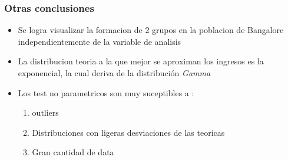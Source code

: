 \documentclass{beamer}
\begin{document}
\begin{frame}

  \frametitle{Otras conclusiones}

  \begin{itemize}
    \item Se logra visualizar la formacion de 2 grupos en la poblacion
      de Bangalore independientemente de la variable de analisis

    \item La distribucion teoria a la que mejor se aproximan los ingresos
      es la exponencial, la cual deriva de la distribución \textit{Gamma}

    \item Los test no parametricos son muy suceptibles a :
      \begin{enumerate}
        \item outliers
        \item Distribuciones con ligeras desviaciones de las teoricas
        \item Gran cantidad de data
      \end{enumerate}
  \end{itemize}


\end{frame}
\end{document}
